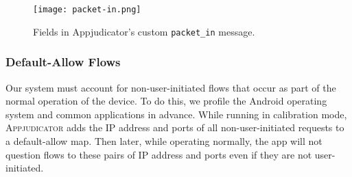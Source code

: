 \begin{figure}[h]
	\centering
	\texttt{[image: packet-in.png]}
    \caption{Fields in Appjudicator's custom \texttt{packet\_in} message.}
    \label{fig:packet-in}
\end{figure}

\subsubsection{Default-Allow Flows}
\label{sec:default-allow-flows}

Our system must account for non-user-initiated flows that occur as part of the
normal operation of the device. To do this, we profile the Android operating
system and common applications in advance.  While running in calibration mode,
\textsc{Appjudicator} adds the IP address and ports of all non-user-initiated
requests to a default-allow map. Then later, while operating normally, the app
will not question flows to these pairs of IP address and ports even if they are
not user-initiated.


\newpage
